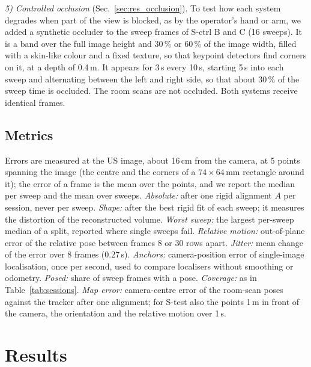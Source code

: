 \documentclass[9pt,shortpaper,twoside,web]{ieeecolor2}
\newcommand{\Stest}{S-test}
\newcommand{\Sctrl}{S-ctrl}
\begin{document}
\emph{5) Controlled occlusion} (Sec.~\ref{sec:res_occlusion}). To test how each system degrades when part of the view is blocked, as by the operator's hand or arm, we added a synthetic occluder to the sweep frames of \Sctrl{} B and C (16 sweeps). It is a band over the full image height and 30\,\% or 60\,\% of the image width, filled with a skin-like colour and a fixed texture, so that keypoint detectors find corners on it, at a depth of 0.4\,m. It appears for 3\,s every 10\,s, starting 5\,s into each sweep and alternating between the left and right side, so that about 30\,\% of the sweep time is occluded. The room scans are not occluded. Both systems receive identical frames.

\subsection{Metrics}
\label{sec:metrics}
Errors are measured at the US image, about 16\,cm from the camera, at 5 points spanning the image (the centre and the corners of a $74\times64$\,mm rectangle around it); the error of a frame is the mean over the points, and we report the median per sweep and the mean over sweeps. \emph{Absolute:} after one rigid alignment $A$ per session, never per sweep. \emph{Shape:} after the best rigid fit of each sweep; it measures the distortion of the reconstructed volume. \emph{Worst sweep:} the largest per-sweep median of a split, reported where single sweeps fail. \emph{Relative motion:} out-of-plane error of the relative pose between frames 8 or 30 rows apart. \emph{Jitter:} mean change of the error over 8 frames (0.27\,s). \emph{Anchors:} camera-position error of single-image localisation, once per second, used to compare localisers without smoothing or odometry. \emph{Posed:} share of sweep frames with a pose. \emph{Coverage:} as in Table~\ref{tab:sessions}. \emph{Map error:} camera-centre error of the room-scan poses against the tracker after one alignment; for \Stest{} also the points 1\,m in front of the camera, the orientation and the relative motion over 1\,s.

\section{Results}
\end{document}

